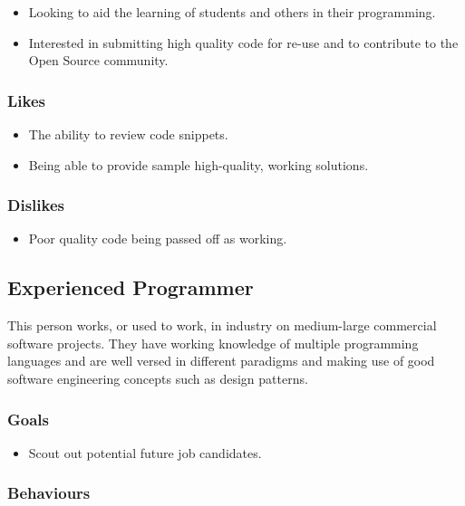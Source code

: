 \documentclass[11pt,a4paper]{article}
\begin{document}
\begin{itemize}
\item Looking to aid the learning of students and others in their programming.
\item Interested in submitting high quality code for re-use and to contribute
to the Open Source community.
\end{itemize}

\subsubsection{Likes}

\begin{itemize}
\item The ability to review code snippets.
\item Being able to provide sample high-quality, working solutions.
\end{itemize}

\subsubsection{Dislikes}

\begin{itemize}
\item Poor quality code being passed off as working.
\end{itemize}

\newpage

\subsection{Experienced Programmer}

This person works, or used to work, in industry on medium-large commercial
software projects. They have working knowledge of multiple programming
languages and are well versed in different paradigms and making use of good
software engineering concepts such as design patterns.

\subsubsection{Goals}

\begin{itemize}
\item Scout out potential future job candidates.
\end{itemize}

\subsubsection{Behaviours}
\end{document}
